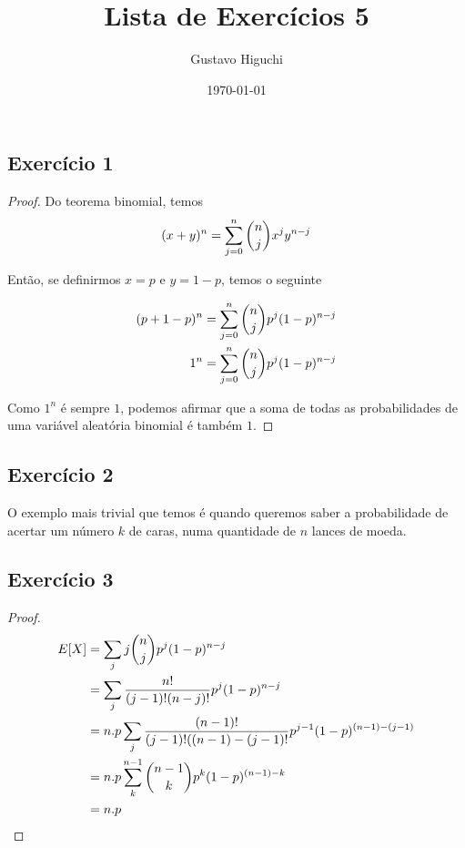 \documentclass{article}
\title{Lista de Exercícios 5}
\author{Gustavo Higuchi}
\date{\today}
\begin{document}
\maketitle

\tableofcontents
\newpage


\chapter{}
\section{Exercício 1}
\begin{proof}
    Do teorema binomial, temos
    \begin{equation}
        \notag
        (x + y)^n = \sum\limits_{j=0}^{n} {n \choose j}x^j y^{n-j}
    \end{equation}

    Então, se definirmos $x = p$ e $y = 1 - p$, temos o seguinte

    \begin{equation}
        \notag
        \begin{split}
            (p + 1-p)^n &= \sum\limits_{j=0}^{n} {n \choose j}p^j (1-p)^{n-j}\\
            1^n &= \sum\limits_{j=0}^{n} {n \choose j}p^j (1-p)^{n-j}
        \end{split}
    \end{equation}

    Como $1^n$ é sempre $1$, podemos afirmar que a soma de todas as probabilidades
    de uma variável aleatória binomial é também $1$. 
\end{proof}

\section{Exercício 2}
O exemplo mais trivial que temos é quando queremos saber a probabilidade de 
acertar um número $k$ de caras, numa quantidade de $n$ lances de moeda.

\section{Exercício 3}
\begin{proof}
    \begin{equation}
        \notag
        \begin{split}
            E[X] &= \sum\limits_{j} j {n \choose j} p^j(1-p)^{n-j}\\
            &= \sum\limits_{j} \dfrac{n!}{(j-1)!(n-j)!} p^j(1-p)^{n-j}\\
            &= n.p \sum\limits_{j} \dfrac{(n-1)!}{(j-1)!((n-1)-(j-1)!} p^{j-1}(1-p)^{(n-1)-(j-1)}\\
            &= n.p \sum\limits_{k}^{n-1} {n-1 \choose k} p^k(1-p)^{(n-1)-k}\\
            &= n.p
        \end{split}
    \end{equation}
\end{proof}
\end{document}
